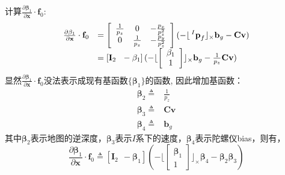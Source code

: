 \documentclass{article}
\begin{document}
\par
计算$\frac{\partial\mathbf{\beta}_1}{\partial\textbf{x}}\cdot\textbf{f}_0$:
\begin{equation}
    \begin{array}{ll}
        \frac{\partial\mathbf{\beta}_1}{\partial\textbf{x}}\cdot\textbf{f}_{0}
        &=\left[\begin{array}{ccc}
        \frac{1}{p_z} &0 &-\frac{p_x}{p_z^2}\\
        0 &\frac{1}{p_z} &-\frac{p_y}{p_z^2}\end{array}\right]
        (-\lfloor\sideset{^I}{}{\mathop{\textbf{p}_{f}}}\rfloor_{\times}\textbf{b}_{g}-\textbf{C}\textbf{v})\\
        &=\left[\textbf{I}_{2}\ \ -\mathbf{\beta}_{1}\right]
        (-\lfloor\left[\begin{array}{c} \mathbf{\beta}_1\\ 1 \end{array}\right]\rfloor_{\times}\textbf{b}_{g}-\frac{1}{p_z}\textbf{C}\textbf{v})
    \end{array}
\end{equation}
显然$\frac{\partial\mathbf{\beta}_1}{\partial\textbf{x}}\cdot\textbf{f}_0$没法表示成现有基函数$\{\mathbf{\beta}_1\}$的函数,
因此增加基函数：
\begin{eqnarray}
    \mathbf{\beta}_2\triangleq& \frac{1}{p_z}\\
    \mathbf{\beta}_3\triangleq& \textbf{C}\textbf{v}\\
    \mathbf{\beta}_4\triangleq& \textbf{b}_{g}
\end{eqnarray}
其中$\mathbf{\beta}_2$表示地图的逆深度，$\mathbf{\beta}_3$表示$I$系下的速度，$\mathbf{\beta}_4$表示陀螺仪bias，则有，
\begin{equation}
    \frac{\partial\mathbf{\beta}_1}{\partial\textbf{x}}\cdot\textbf{f}_{0}
    \triangleq\left[\textbf{I}_{2}\ \ -\mathbf{\beta}_{1}\right]
    (-\lfloor\left[\begin{array}{c} \mathbf{\beta}_1\\ 1 \end{array}\right]\rfloor_{\times}
        \mathbf{\beta}_4-\mathbf{\beta}_{2}\mathbf{\beta}_3)
\end{equation}
\end{document}
